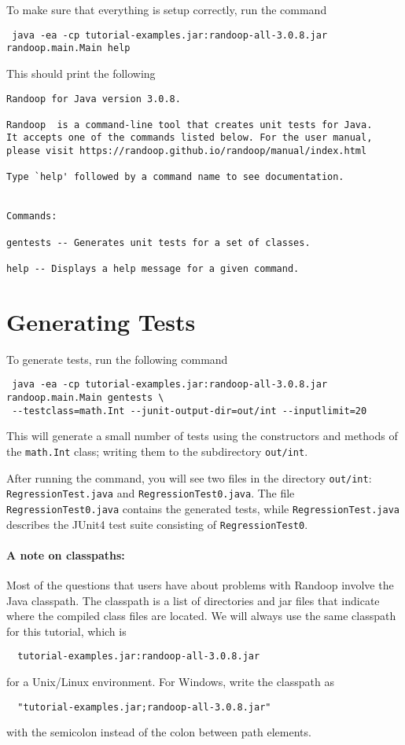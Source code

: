 \documentclass[11pt, oneside]{article} %
\begin{document}
To make sure that everything is setup correctly, run the command
\begin{verbatim}
 java -ea -cp tutorial-examples.jar:randoop-all-3.0.8.jar randoop.main.Main help
\end{verbatim}
This should print the following
\begin{verbatim}
Randoop for Java version 3.0.8.

Randoop  is a command-line tool that creates unit tests for Java.
It accepts one of the commands listed below. For the user manual,
please visit https://randoop.github.io/randoop/manual/index.html

Type `help' followed by a command name to see documentation.


Commands:

gentests -- Generates unit tests for a set of classes.

help -- Displays a help message for a given command.
\end{verbatim}



\section{Generating Tests}
To generate tests, run the following command 
\begin{verbatim}
 java -ea -cp tutorial-examples.jar:randoop-all-3.0.8.jar randoop.main.Main gentests \
 --testclass=math.Int --junit-output-dir=out/int --inputlimit=20
\end{verbatim}
This will generate a small number of tests using the constructors and methods of the \texttt{math.Int} class; writing them to the subdirectory \texttt{out/int}.

After running the command, you will see two files in the directory \texttt{out/int}:
 \texttt{RegressionTest.java} and \texttt{RegressionTest0.java}.
The file \texttt{RegressionTest0.java} contains the generated tests, while  \texttt{RegressionTest.java}  describes the JUnit4 test suite consisting of  \texttt{RegressionTest0}.

\paragraph{A note on classpaths:} 
Most of the questions that users have about problems with Randoop involve the Java classpath.
The classpath is a list of directories and jar files that indicate where the compiled class files are located.
We will always use the same classpath for this tutorial, which is
\begin{verbatim}
  tutorial-examples.jar:randoop-all-3.0.8.jar
\end{verbatim}
for a Unix/Linux environment.
For Windows, write the classpath as
\begin{verbatim}
  "tutorial-examples.jar;randoop-all-3.0.8.jar"
\end{verbatim}
with the semicolon instead of the colon between path elements.
\end{document}
